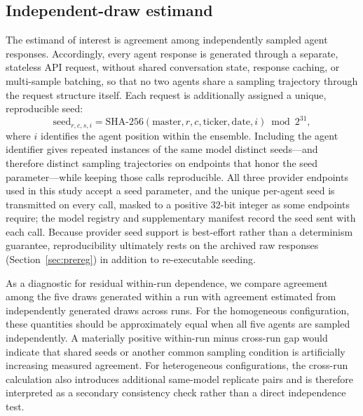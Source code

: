 \documentclass{ieeeaccess}
\begin{document}
\subsection{Independent-draw estimand}
\label{subsec:estimand}
\label{sec:estimand}
The estimand of interest is agreement among independently sampled agent
responses. Accordingly, every agent response is generated through a separate,
stateless API request, without shared conversation state, response caching, or
multi-sample batching, so that no two agents share a sampling trajectory through
the request structure itself. Each request is additionally assigned a unique,
reproducible seed:
\begin{equation}
\mathrm{seed}_{r,c,s,i}=\mathrm{SHA\text{-}256}(\mathrm{master},r,c,\mathrm{ticker},\mathrm{date},i)\bmod 2^{31},
\end{equation}
where $i$ identifies the agent position within the ensemble. Including the
agent identifier gives repeated instances of the same model distinct seeds---and
therefore distinct sampling trajectories on endpoints that honor the seed
parameter---while keeping those calls reproducible. All three provider endpoints
used in this study accept a seed parameter, and the unique per-agent seed is
transmitted on every call, masked to a positive 32-bit integer as some endpoints
require; the model registry and supplementary manifest record the seed sent with
each call. Because provider seed support is best-effort rather than a
determinism guarantee, reproducibility ultimately rests on the archived raw
responses (Section~\ref{sec:prereg}) in addition to re-executable seeding.

As a diagnostic for residual within-run dependence, we compare agreement among
the five draws generated within a run with agreement estimated from
independently generated draws across runs. For the homogeneous configuration,
these quantities should be approximately equal when all five agents are sampled
independently. A materially positive within-run minus cross-run gap would
indicate that shared seeds or another common sampling condition is artificially
increasing measured agreement. For heterogeneous configurations, the cross-run
calculation also introduces additional same-model replicate pairs and is
therefore interpreted as a secondary consistency check rather than a direct
independence test.
\end{document}
